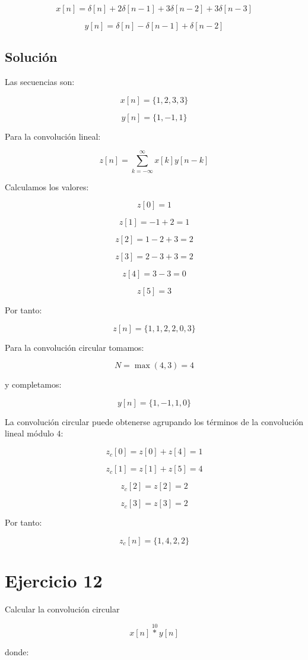 \documentclass[fleqn]{article}
\begin{document}
	\[
	x[n]
	=
	\delta[n]
	+
	2\delta[n-1]
	+
	3\delta[n-2]
	+
	3\delta[n-3]
	\]

	\[
	y[n]
	=
	\delta[n]
	-
	\delta[n-1]
	+
	\delta[n-2]
	\]

	\subsection{Solución}

	Las secuencias son:

	\[
	x[n]=\{1,2,3,3\}
	\]

	\[
	y[n]=\{1,-1,1\}
	\]

	Para la convolución lineal:

	\[
	z[n]
	=
	\sum_{k=-\infty}^{\infty}
	x[k]y[n-k]
	\]

	Calculamos los valores:

	\[
	z[0]=1
	\]

	\[
	z[1]=-1+2=1
	\]

	\[
	z[2]=1-2+3=2
	\]

	\[
	z[3]=2-3+3=2
	\]

	\[
	z[4]=3-3=0
	\]

	\[
	z[5]=3
	\]

	Por tanto:

	\[
	\boxed{
	z[n]=\{1,1,2,2,0,3\}
	}
	\]

	Para la convolución circular tomamos:

	\[
	N=\max(4,3)=4
	\]

	y completamos:

	\[
	y[n]=\{1,-1,1,0\}
	\]

	La convolución circular puede obtenerse agrupando los términos de la convolución lineal módulo $4$:

	\[
	z_c[0]
	=
	z[0]+z[4]
	=
	1
	\]

	\[
	z_c[1]
	=
	z[1]+z[5]
	=
	4
	\]

	\[
	z_c[2]
	=
	z[2]
	=
	2
	\]

	\[
	z_c[3]
	=
	z[3]
	=
	2
	\]

	Por tanto:

	\[
	\boxed{
	z_c[n]
	=
	\{1,4,2,2\}
	}
	\]

\section{Ejercicio 12}
	Calcular la convolución circular

	\[
	x[n]\overset{10}{*}y[n]
	\]

	donde:
\end{document}
